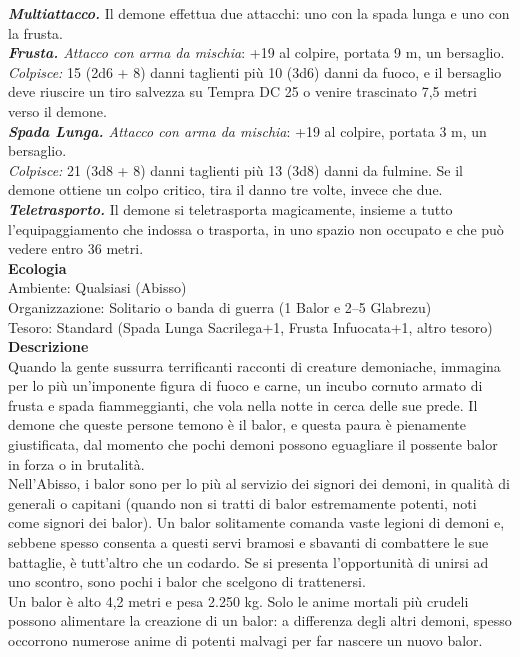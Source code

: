 \begin{multicols}{2}
\emph{\textbf{Multiattacco.}} Il demone effettua due attacchi: uno con la spada lunga e uno con la frusta.\\
\emph{\textbf{Frusta.} Attacco con arma da mischia}: +19 al colpire, portata 9 m, un bersaglio.\\
\emph{Colpisce:} 15 (2d6 + 8) danni taglienti più 10 (3d6) danni da fuoco, e il bersaglio deve riuscire un tiro salvezza su Tempra DC  25 o venire trascinato 7,5 metri verso il demone.\\
\emph{\textbf{Spada Lunga.} Attacco con arma da mischia}: +19 al colpire, portata 3 m, un bersaglio.\\
\emph{Colpisce:} 21 (3d8 + 8) danni taglienti più 13 (3d8) danni da fulmine. Se il demone ottiene un colpo critico, tira il danno tre volte, invece che due.\\
\emph{\textbf{Teletrasporto.}} Il demone si teletrasporta magicamente, insieme a tutto l'equipaggiamento che indossa o trasporta, in uno spazio non occupato e che può vedere entro 36 metri.\\
\textbf{Ecologia}\\
Ambiente: Qualsiasi (Abisso)\\
Organizzazione: Solitario o banda di guerra (1 Balor e 2–5 Glabrezu)\\
Tesoro: Standard (Spada Lunga Sacrilega+1, Frusta Infuocata+1, altro tesoro)\\
\textbf{Descrizione}\\
Quando la gente sussurra terrificanti racconti di creature demoniache, immagina per lo più un’imponente figura di fuoco e carne, un incubo cornuto armato di frusta e spada fiammeggianti, che vola nella notte in cerca delle sue prede. Il demone che queste persone temono è il balor, e questa paura è pienamente giustificata, dal momento che pochi demoni possono eguagliare il possente balor in forza o in brutalità.\\
Nell’Abisso, i balor sono per lo più al servizio dei signori dei demoni, in qualità di generali o capitani (quando non si tratti di balor estremamente potenti, noti come signori dei balor). Un balor solitamente comanda vaste legioni di demoni e, sebbene spesso consenta a questi servi bramosi e sbavanti di combattere le sue battaglie, è tutt’altro che un codardo. Se si presenta l’opportunità di unirsi ad uno scontro, sono pochi i balor che scelgono di trattenersi.\\
Un balor è alto 4,2 metri e pesa 2.250 kg. Solo le anime mortali più crudeli possono alimentare la creazione di un balor: a differenza degli altri demoni, spesso occorrono numerose anime di potenti malvagi per far nascere un nuovo balor.\\


\end{multicols}
